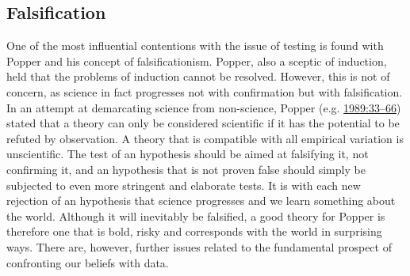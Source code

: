 \documentclass[
  12pt,
  a4paper,
  oneside]{book}
\begin{document}
\hypertarget{falsification}{%
\subsection{Falsification}\label{falsification}}

One of the most influential contentions with the issue of testing is found with Popper and his concept of falsificationism. Popper, also a sceptic of induction, held that the problems of induction cannot be resolved. However, this is not of concern, as science in fact progresses not with confirmation but with falsification. In an attempt at demarcating science from non-science, Popper (e.g. \protect\hyperlink{ref-popper1989}{1989:33--66}) stated that a theory can only be considered scientific if it has the potential to be refuted by observation. A theory that is compatible with all empirical variation is unscientific. The test of an hypothesis should be aimed at falsifying it, not confirming it, and an hypothesis that is not proven false should simply be subjected to even more stringent and elaborate tests. It is with each new rejection of an hypothesis that science progresses and we learn something about the world. Although it will inevitably be falsified, a good theory for Popper is therefore one that is bold, risky and corresponds with the world in surprising ways. There are, however, further issues related to the fundamental prospect of confronting our beliefs with data.
\end{document}
